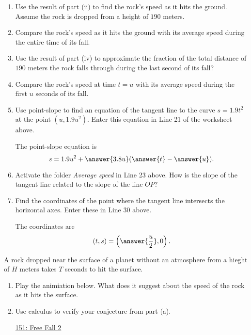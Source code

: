 \documentclass{ximera}
\begin{document}
\begin{exploration}
\begin{enumerate}
\begin{enumerate}
\item Use the result of part (ii) to find the rock's speed as it hits the ground. Assume the rock is dropped from a height of $190$ meters.

\item Compare the rock's speed as it hits the ground with its average speed during the entire time of its fall.

\item  Use the result of part (iv) to approximate the fraction of the total distance of $190$ meters the rock falls through during the last second of its fall? 

\item Compare the rock's speed at time $t=u$ with its average speed during the first $u$ seconds of its fall.

\item Use point-slope to find an equation of the tangent line to the curve $s=1.9t^2$ at the point $(u,1.9u^2)$. Enter this equation in Line 21 of the worksheet above.

The point-slope equation is
\[
     s = 1.9u^2 + \answer{3.8u} ( \answer{t} - \answer{u}) .
\]

\item Activate the folder \emph{Average speed} in Line 23 above. How is the slope of the tangent line related to the slope of the line $OP$?

\item Find the coordinates of the point where the tangent line intersects the horizontal axes. Enter these in Line 30 above.

The coordinates are
\[
  (t,s) = \left( \answer{\frac{u}{2}} , 0 \right) .
\]


\end{enumerate}


\end{enumerate}

\end{exploration}

\begin{question} \label{Qd90t90ette}
A rock dropped near the surface of a planet without an atmosphere from a hieght of $H$ meters takes $T$ seconds to hit the surface. 

\begin{enumerate}

\item Play the animiation below. What does it suggest about the speed of the rock as it hits the surface.

\item Use calculus to verify your conjecture from part (a).

\begin{onlineOnly}
    \begin{center}
\end{center}
\end{onlineOnly}

\href{https://www.desmos.com/calculator/gjqnrnecku}{151: Free Fall 2}

\end{enumerate}

\end{question}
\end{document}
